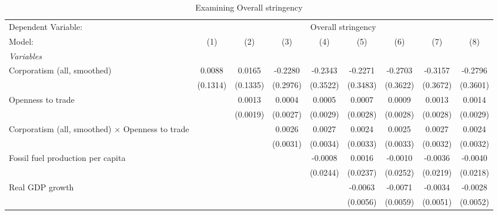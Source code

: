 
\begin{table}[htbp]
   \caption{Examining Overall stringency}
   \centering
   \begin{tabular}{lcccccccc}
      \tabularnewline \midrule \midrule
      Dependent Variable: & \multicolumn{8}{c}{Overall stringency}\\
      Model:                                                  & (1)                   & (2)      & (3)      & (4)      & (5)      & (6)      & (7)      & (8)\\  
      \midrule
      \emph{Variables}\\
      Corporatism (all, smoothed)                             & 0.0088                & 0.0165   & -0.2280  & -0.2343  & -0.2271  & -0.2703  & -0.3157  & -0.2796\\   
                                                              & (0.1314)              & (0.1335) & (0.2976) & (0.3522) & (0.3483) & (0.3622) & (0.3672) & (0.3601)\\   
      Openness to trade                                       &                       & 0.0013   & 0.0004   & 0.0005   & 0.0007   & 0.0009   & 0.0013   & 0.0014\\   
                                                              &                       & (0.0019) & (0.0027) & (0.0029) & (0.0028) & (0.0028) & (0.0028) & (0.0029)\\   
      Corporatism (all, smoothed) $\times$ Openness to trade  &                       &          & 0.0026   & 0.0027   & 0.0024   & 0.0025   & 0.0027   & 0.0024\\   
                                                              &                       &          & (0.0031) & (0.0034) & (0.0033) & (0.0033) & (0.0032) & (0.0032)\\   
      Fossil fuel production per capita                       &                       &          &          & -0.0008  & 0.0016   & -0.0010  & -0.0036  & -0.0040\\   
                                                              &                       &          &          & (0.0244) & (0.0237) & (0.0252) & (0.0219) & (0.0218)\\   
      Real GDP growth                                         &                       &          &          &          & -0.0063  & -0.0071  & -0.0034  & -0.0028\\   
                                                              &                       &          &          &          & (0.0056) & (0.0059) & (0.0051) & (0.0052)\\   

\end{tabular}
\end{table}
